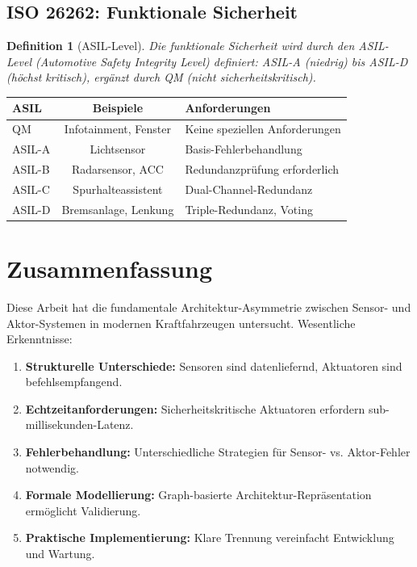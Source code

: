 ﻿\documentclass[a4paper,12pt]{article}
\newtheorem{definition}{Definition}
\begin{document}
\subsection{ISO 26262: Funktionale Sicherheit}

\begin{definition}[ASIL-Level]
Die funktionale Sicherheit wird durch den ASIL-Level (Automotive Safety Integrity 
Level) definiert: ASIL-A (niedrig) bis ASIL-D (höchst kritisch), ergänzt durch 
QM (nicht sicherheitskritisch).
\end{definition}

\begin{table}[h]
\centering
\begin{tabular}{|l|c|l|}
\hline
\textbf{ASIL} & \textbf{Beispiele} & \textbf{Anforderungen} \\
\hline
QM & Infotainment, Fenster & Keine speziellen Anforderungen \\
ASIL-A & Lichtsensor & Basis-Fehlerbehandlung \\
ASIL-B & Radarsensor, ACC & Redundanzprüfung erforderlich \\
ASIL-C & Spurhalteassistent & Dual-Channel-Redundanz \\
ASIL-D & Bremsanlage, Lenkung & Triple-Redundanz, Voting \\
\hline
\end{tabular}
\end{table}

\section{Zusammenfassung}

Diese Arbeit hat die fundamentale Architektur-Asymmetrie zwischen Sensor- und 
Aktor-Systemen in modernen Kraftfahrzeugen untersucht. Wesentliche Erkenntnisse:

\begin{enumerate}
	\item \textbf{Strukturelle Unterschiede:} Sensoren sind datenliefernd, Aktuatoren 
	sind befehlsempfangend.
	
	\item \textbf{Echtzeitanforderungen:} Sicherheitskritische Aktuatoren erfordern 
	sub-millisekunden-Latenz.
	
	\item \textbf{Fehlerbehandlung:} Unterschiedliche Strategien für Sensor- vs. 
	Aktor-Fehler notwendig.
	
	\item \textbf{Formale Modellierung:} Graph-basierte Architektur-Repräsentation 
	ermöglicht Validierung.
	
	\item \textbf{Praktische Implementierung:} Klare Trennung vereinfacht Entwicklung 
	und Wartung.
\end{enumerate}
\end{document}
